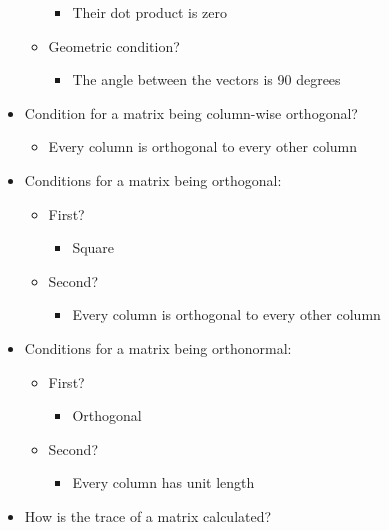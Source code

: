 \documentclass[
  letterpaper,
  DIV=11,
  numbers=noendperiod]{scrartcl}
\providecommand{\tightlist}{%
  \setlength{\itemsep}{0pt}\setlength{\parskip}{0pt}}\usepackage{longtable,booktabs,array}
\begin{document}
\begin{itemize}
\begin{itemize}
    \begin{itemize}
    \tightlist
    \item
      Their dot product is zero
    \end{itemize}
  \item
    Geometric condition?

    \begin{itemize}
    \tightlist
    \item
      The angle between the vectors is 90 degrees
    \end{itemize}
  \end{itemize}
\item
  Condition for a matrix being column-wise orthogonal?

  \begin{itemize}
  \tightlist
  \item
    Every column is orthogonal to every other column
  \end{itemize}
\item
  Conditions for a matrix being orthogonal:

  \begin{itemize}
  \tightlist
  \item
    First?

    \begin{itemize}
    \tightlist
    \item
      Square
    \end{itemize}
  \item
    Second?

    \begin{itemize}
    \tightlist
    \item
      Every column is orthogonal to every other column
    \end{itemize}
  \end{itemize}
\item
  Conditions for a matrix being orthonormal:

  \begin{itemize}
  \tightlist
  \item
    First?

    \begin{itemize}
    \tightlist
    \item
      Orthogonal
    \end{itemize}
  \item
    Second?

    \begin{itemize}
    \tightlist
    \item
      Every column has unit length
    \end{itemize}
  \end{itemize}
\item
  How is the trace of a matrix calculated?


\end{itemize}
\end{document}
